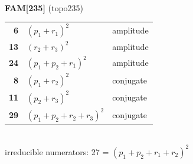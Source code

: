 \documentclass[10pt]{article}
\begin{document}
\begin{minipage}[t]{0.48\textwidth}
{}\\[2mm]\textbf{FAM[235]} (topo235)\\[2pt]{\footnotesize\begin{tabular}{@{}r@{\ \ }l@{\ \ }l@{}}\textbf{6} & $(p_1+r_1)^2$ & amplitude\\
\textbf{13} & $(r_2+r_3)^2$ & amplitude\\
\textbf{24} & $(p_1+p_2+r_1)^2$ & amplitude\\
\textbf{8} & $(p_1+r_2)^2$ & conjugate\\
\textbf{11} & $(p_2+r_3)^2$ & conjugate\\
\textbf{29} & $(p_1+p_2+r_2+r_3)^2$ & conjugate\\\end{tabular}}\\[2pt]{\scriptsize irreducible numerators: 27 = $(p_1+p_2+r_1+r_2)^2$}\end{minipage}

\bigskip
\end{document}
